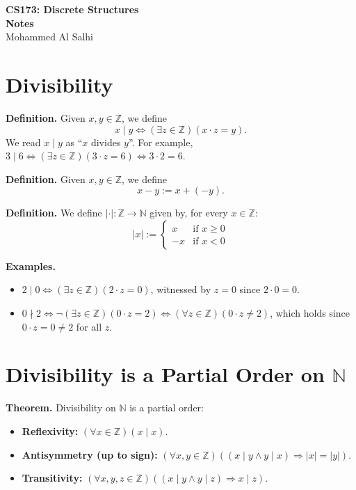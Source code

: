 \documentclass[12pt]{article}
\theoremstyle{proofstyle}
\renewcommand{\maketitle}{%
  \begin{flushleft}
    {\Large\bfseries CS173: Discrete Structures}\\[0.3em]
    {\Large\bfseries Notes}\\[0.5em]
    {\normalsize Mohammed Al Salhi}
  \end{flushleft}
  \vspace{1em}
}
\begin{document}
\maketitle

\section*{Divisibility}

\textbf{Definition.} Given $x, y \in \mathbb{Z}$, we define
\[
    x \mid y \iff (\exists z \in \mathbb{Z})(x \cdot z = y).
\]
We read $x \mid y$ as ``$x$ divides $y$''. For example,
$3 \mid 6 \iff (\exists z \in \mathbb{Z})(3 \cdot z = 6) \iff 3 \cdot 2 = 6$.

\textbf{Definition.} Given $x, y \in \mathbb{Z}$, we define
\[
    x - y := x + (-y).
\]

\textbf{Definition.} We define $|\cdot| : \mathbb{Z} \to \mathbb{N}$ given by,
for every $x \in \mathbb{Z}$:
\[
    |x| :=
    \begin{cases}
        x  & \text{if } x \geq 0 \\
        -x & \text{if } x < 0
    \end{cases}
\]

\textbf{Examples.}
\begin{itemize}[itemsep=0.5em]
    \item $2 \mid 0 \iff (\exists z \in \mathbb{Z})(2 \cdot z = 0)$,
          witnessed by $z = 0$ since $2 \cdot 0 = 0$.
    \item $0 \nmid 2 \iff \neg(\exists z \in \mathbb{Z})(0 \cdot z = 2)
          \iff (\forall z \in \mathbb{Z})(0 \cdot z \neq 2)$,
          which holds since $0 \cdot z = 0 \neq 2$ for all $z$.
\end{itemize}

\section*{Divisibility is a Partial Order on $\mathbb{N}$}

\textbf{Theorem.} Divisibility on $\mathbb{N}$ is a partial order:
\begin{itemize}[itemsep=0.5em]
    \item \textbf{Reflexivity:} $(\forall x \in \mathbb{Z})(x \mid x)$.
    \item \textbf{Antisymmetry (up to sign):} $(\forall x, y \in \mathbb{Z})((x \mid y \wedge y \mid x)
          \Rightarrow |x| = |y|)$.
    \item \textbf{Transitivity:} $(\forall x, y, z \in \mathbb{Z})((x \mid y \wedge y \mid z)
          \Rightarrow x \mid z)$.
\end{itemize}
\end{document}
